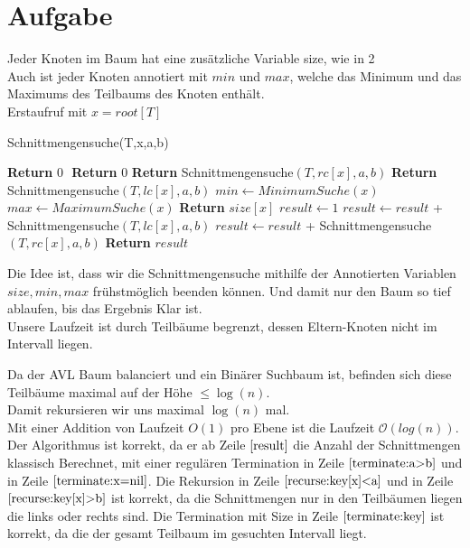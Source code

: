 \documentclass{article}
\newcounter{AufgabenCounter}
\newcounter{TeilaufgabenCounter}
\newenvironment{aufgabe}{\section*{Aufgabe \theAufgabenCounter}\setcounter{TeilaufgabenCounter}{1}}{\stepcounter{AufgabenCounter}}
\begin{document}
\begin{aufgabe}
  Jeder Knoten im Baum hat eine zusätzliche Variable size, wie in 2 \\
  Auch ist jeder Knoten annotiert mit $min$ und $max$, welche das Minimum und das Maximums des Teilbaums des Knoten enthält.\\
  Erstaufruf mit $x=root[T]$\\
  \begin{algorithm}[H]
    \caption{Schnittmengensuche(T,x,a,b)}
    \begin{algorithmic}[1]
      \State \textbf{Return} 0 $\label{terminate:a>b}$
      \EndIf
      \State \textbf{Return} 0 \label{terminate:x=nil}
      \EndIf
      \State \textbf{Return} Schnittmengensuche$(T,rc[x],a,b)$ \label{recurse:key[x]<a}
      \State \textbf{Return} Schnittmengensuche$(T,lc[x],a,b)$ \label{recurse:key[x]>b}
      \Else
      \State $min \gets MinimumSuche(x)$
      \State $max \gets MaximumSuche(x)$
      \State \textbf{Return} $size[x]$ \label{terminate:key}
      \Else
      \State $result \gets 1$ \label{result}
      \State $result \gets result$ + Schnittmengensuche$(T,lc[x],a,b)$
      \State $result \gets result$ + Schnittmengensuche$(T,rc[x],a,b)$
      \State \textbf{Return} $result$
      \EndIf
      \EndIf
    \end{algorithmic}
  \end{algorithm}

  Die Idee ist, dass wir die Schnittmengensuche mithilfe der Annotierten Variablen $size, min, max$ frühstmöglich beenden können.
  Und damit nur den Baum so tief ablaufen, bis das Ergebnis Klar ist.\\

  Unsere Laufzeit ist durch Teilbäume begrenzt, dessen Eltern-Knoten nicht im Intervall liegen.

  Da der AVL Baum balanciert und ein Binärer Suchbaum ist, befinden sich diese Teilbäume maximal auf der Höhe $\leq \log(n)$.\\
  Damit rekursieren wir uns maximal $\log(n)$ mal.\\
  Mit einer Addition von Laufzeit $O(1)$ pro Ebene ist die Laufzeit $\mathcal{O}(log(n))$.\\


  Der Algorithmus ist korrekt, da er ab Zeile $\ref{result}$ die Anzahl der Schnittmengen klassisch Berechnet, mit einer regulären Termination
  in Zeile $\ref{terminate:a>b}$ und in Zeile $\ref{terminate:x=nil}$.
  Die Rekursion in Zeile $\ref{recurse:key[x]<a}$ und in Zeile $\ref{recurse:key[x]>b}$ ist korrekt, da die Schnittmengen nur in den Teilbäumen liegen
  die links oder rechts sind.
  Die Termination mit Size in Zeile $\ref{terminate:key}$ ist korrekt, da die der gesamt Teilbaum im gesuchten Intervall liegt.
\end{aufgabe}
\end{document}
